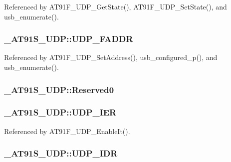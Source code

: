 Referenced by AT91F\_\-UDP\_\-GetState(), AT91F\_\-UDP\_\-SetState(), and usb\_\-enumerate().\hypertarget{struct__AT91S__UDP_b2436c0f24250cfc5f3d5b4cc63b62b9}{
\subsubsection{ {\bf \_\-AT91S\_\-UDP::UDP\_\-FADDR}}}
\label{struct__AT91S__UDP_b2436c0f24250cfc5f3d5b4cc63b62b9}




Referenced by AT91F\_\-UDP\_\-SetAddress(), usb\_\-configured\_\-p(), and usb\_\-enumerate().\hypertarget{struct__AT91S__UDP_21ec9d439f9a93d433e51086767e9027}{
\subsubsection{ {\bf \_\-AT91S\_\-UDP::Reserved0}}}
\label{struct__AT91S__UDP_21ec9d439f9a93d433e51086767e9027}


\hypertarget{struct__AT91S__UDP_fd91ae40c2301d69f3518adcbddcbd1e}{
\subsubsection{ {\bf \_\-AT91S\_\-UDP::UDP\_\-IER}}}
\label{struct__AT91S__UDP_fd91ae40c2301d69f3518adcbddcbd1e}




Referenced by AT91F\_\-UDP\_\-EnableIt().\hypertarget{struct__AT91S__UDP_5487e1dc226d511f8fe09f440ad663b7}{
\subsubsection{ {\bf \_\-AT91S\_\-UDP::UDP\_\-IDR}}}
\label{struct__AT91S__UDP_5487e1dc226d511f8fe09f440ad663b7}





